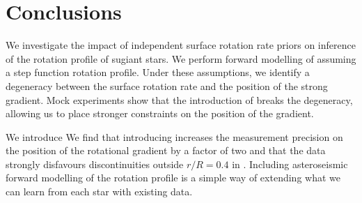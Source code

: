 \section{Conclusions}
\label{sec:conclusion_subg}


We investigate the impact of independent surface rotation rate priors on inference of the rotation profile of sugiant stars. We perform forward modelling of assuming a step function rotation profile. Under these assumptions, we identify a degeneracy between the surface rotation rate and the position of the strong gradient. Mock experiments show that the introduction of  breaks the degeneracy, allowing us to place stronger constraints on the position of the gradient.

We introduce 
We find that introducing  increases the measurement precision on the position of the rotational gradient by a factor of two and that the data strongly disfavours discontinuities outside $r/R = 0.4$ in \thestar{}. Including  asteroseismic forward modelling of the rotation profile is a simple way of extending what we can learn from each star with existing data.


